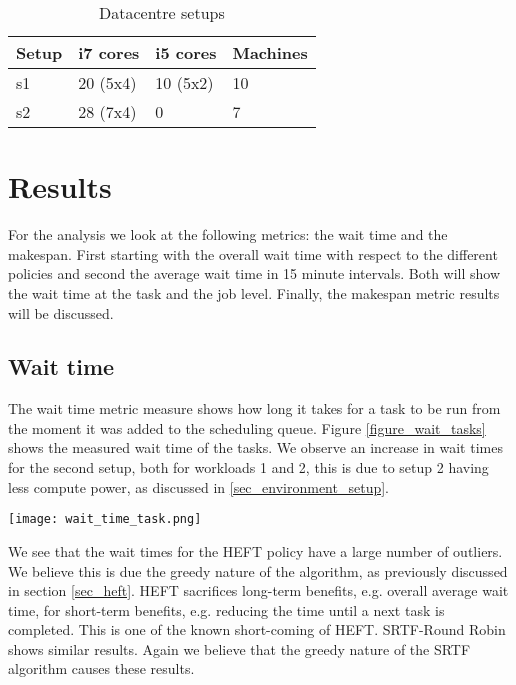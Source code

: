 \documentclass[twocolumn,a4]{scrartcl}
\begin{document}
\begin{table}[h]
\begin{tabular}{l || l | l | l}
  \textbf{Setup} & \textbf{i7 cores} & \textbf{i5 cores} & \textbf{Machines} \\
  \hline
  s1 & 20 (5x4) & 10 (5x2) & 10 \\
  s2 & 28 (7x4) & 0 & 7 \\
\end{tabular}
\caption{Datacentre setups}
\label{table_setup}
\end{table}



\section{Results} \label{sec_results}

For the analysis we look at the following metrics: the wait time and the makespan. First starting with the overall wait time with respect to the different policies and second the average wait time in 15 minute intervals. Both will show the wait time at the task and the job level. Finally, the makespan metric results will be discussed.


\subsection{Wait time} \label{sec_results_wait_time}

The wait time metric measure shows how long it takes for a task to be run from the moment it was added to the scheduling queue. Figure \ref{figure_wait_tasks} shows the measured wait time of the tasks. We observe an increase in wait times for the second setup, both for workloads 1 and 2, this is due to setup 2 having less compute power, as discussed in \ref{sec_environment_setup}.

\begin{figure*}[p]
  \centering
  \texttt{[image: wait\_time\_task.png]}
  \caption{Wait time for tasks in workload 1 (top) and workload 2 (bottom), using setup 1 (left) and setup 2 (right)}
  \label{figure_wait_tasks}
\end{figure*}

We see that the wait times for the HEFT policy have a large number of outliers. We believe this is due the greedy nature of the algorithm, as previously discussed in section \ref{sec_heft}. HEFT sacrifices long-term benefits, e.g. overall average wait time, for short-term benefits, e.g. reducing the time until a next task is completed. This is one of the known short-coming of HEFT. SRTF-Round Robin shows similar results. Again we believe that the greedy nature of the SRTF algorithm causes these results.
\end{document}
